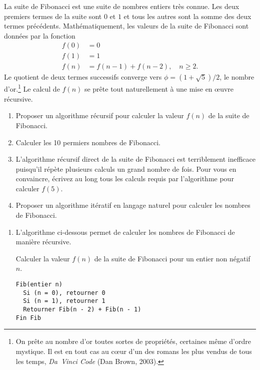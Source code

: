 \begin{exercice}
  La suite de Fibonacci est une suite de
  nombres entiers très connue. Les deux premiers termes de la suite
  sont $0$ et $1$ et tous les autres sont la somme des deux termes
  précédents. Mathématiquement, les valeurs de la suite de Fibonacci
  sont données par la fonction
  \begin{align*}
    f(0) &= 0 \\
    f(1) &= 1 \\
    f(n) & = f(n - 1) + f(n - 2), \quad n \geq 2.
  \end{align*}
  Le quotient de deux termes successifs converge vers
  $\phi = (1 + \sqrt{5})/2$, le nombre d'or.\footnote{%
    On prête au nombre d'or toutes sortes de propriétés, certaines
    même d'ordre mystique. Il est en tout cas au cœur d'un des romans
    les plus vendus de tous les temps, \emph{Da~Vinci Code} (Dan
    Brown, 2003).} %
  Le calcul de $f(n)$ se prête tout naturellement à une mise en œuvre
  récursive.
  \begin{enumerate}
  \item Proposer un algorithme récursif pour calculer la valeur $f(n)$
    de la suite de Fibonacci.
  \item Calculer les 10 permiers nombres de Fibonacci.
  \item L'algorithme récursif direct de la suite de Fibonacci est
    terriblement inefficace puisqu'il répète plusieurs calculs un
    grand nombre de fois. Pour vous en convaincre, écrivez au long
    tous les calculs requis par l'algorithme pour calculer $f(5)$.
  \item Proposer un algorithme itératif en langage naturel pour
    calculer les nombres de Fibonacci.
  \end{enumerate}
  \begin{sol}
    \begin{enumerate}
    \item L'algorithme ci-dessous permet de calculer les nombres de
      Fibonacci de manière récursive.
      \begin{algorithme}
        \label{algo:algorithmes:Fibonacci}
        Calculer la valeur $f(n)$ de la suite de Fibonacci pour un entier non négatif $n$.
        \begin{Schunk}
\begin{Verbatim}
Fib(entier n)
  Si (n = 0), retourner 0
  Si (n = 1), retourner 1
  Retourner Fib(n - 2) + Fib(n - 1)
Fin Fib
\end{Verbatim}

\end{Schunk}
\end{algorithme}
\end{enumerate}
\end{sol}
\end{exercice}
